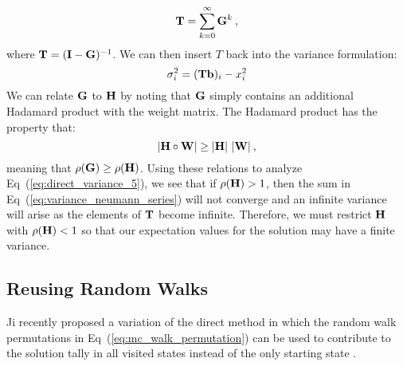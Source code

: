 \begin{equation}
  \mathbf{T} = \sum_{k=0}^{\infty} \mathbf{G}^k\:,
  \label{eq:variance_neumann_series}
\end{equation}
where $\mathbf{T} = (\mathbf{I}-\mathbf{G})^{-1}$. We can then insert $T$ back
into the variance formulation:
\begin{equation}
  \sigma^2_i = (\mathbf{T}\mathbf{b})_i - x_i^2
  \label{eq:direct_variance_5}
\end{equation}
We can relate $\mathbf{G}$ to $\mathbf{H}$ by noting that $\mathbf{G}$ simply
contains an additional Hadamard product with the weight matrix. The
Hadamard product has the property that:
\begin{equation}
  |\mathbf{H} \circ \mathbf{W}| \geq |\mathbf{H}|\ |\mathbf{W}|\:,
  \label{eq:hadamard_inequality}
\end{equation}
meaning that $\rho(\mathbf{G}) \geq \rho(\mathbf{H})$. Using these relations
to analyze Eq~(\ref{eq:direct_variance_5}), we see that if
$\rho(\mathbf{H}) > 1$, then the sum in
Eq~(\ref{eq:variance_neumann_series}) will not converge and an
infinite variance will arise as the elements of $\mathbf{T}$ become
infinite. Therefore, we must restrict $\mathbf{H}$ with $\rho(\mathbf{H}) < 1$
so that our expectation values for the solution may have a finite
variance.

\subsection{Reusing Random Walks}
\label{subsec:reusing_random_walks}
Ji recently proposed a variation of the direct method in which the
random walk permutations in Eq~(\ref{eq:mc_walk_permutation}) can be
used to contribute to the solution tally in all visited states instead
of the only starting state \citep{ji_reusing_2012}.

